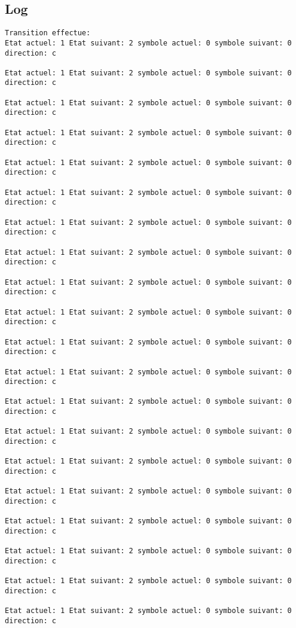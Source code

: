 \documentclass{article}
\begin{document}
\subsection{Log}
\begin{verbatim}
Transition effectue:
Etat actuel: 1 Etat suivant: 2 symbole actuel: 0 symbole suivant: 0 direction: c

Etat actuel: 1 Etat suivant: 2 symbole actuel: 0 symbole suivant: 0 direction: c

Etat actuel: 1 Etat suivant: 2 symbole actuel: 0 symbole suivant: 0 direction: c

Etat actuel: 1 Etat suivant: 2 symbole actuel: 0 symbole suivant: 0 direction: c

Etat actuel: 1 Etat suivant: 2 symbole actuel: 0 symbole suivant: 0 direction: c

Etat actuel: 1 Etat suivant: 2 symbole actuel: 0 symbole suivant: 0 direction: c

Etat actuel: 1 Etat suivant: 2 symbole actuel: 0 symbole suivant: 0 direction: c

Etat actuel: 1 Etat suivant: 2 symbole actuel: 0 symbole suivant: 0 direction: c

Etat actuel: 1 Etat suivant: 2 symbole actuel: 0 symbole suivant: 0 direction: c

Etat actuel: 1 Etat suivant: 2 symbole actuel: 0 symbole suivant: 0 direction: c

Etat actuel: 1 Etat suivant: 2 symbole actuel: 0 symbole suivant: 0 direction: c

Etat actuel: 1 Etat suivant: 2 symbole actuel: 0 symbole suivant: 0 direction: c

Etat actuel: 1 Etat suivant: 2 symbole actuel: 0 symbole suivant: 0 direction: c

Etat actuel: 1 Etat suivant: 2 symbole actuel: 0 symbole suivant: 0 direction: c

Etat actuel: 1 Etat suivant: 2 symbole actuel: 0 symbole suivant: 0 direction: c

Etat actuel: 1 Etat suivant: 2 symbole actuel: 0 symbole suivant: 0 direction: c

Etat actuel: 1 Etat suivant: 2 symbole actuel: 0 symbole suivant: 0 direction: c

Etat actuel: 1 Etat suivant: 2 symbole actuel: 0 symbole suivant: 0 direction: c

Etat actuel: 1 Etat suivant: 2 symbole actuel: 0 symbole suivant: 0 direction: c

Etat actuel: 1 Etat suivant: 2 symbole actuel: 0 symbole suivant: 0 direction: c


\end{verbatim}
\end{document}
